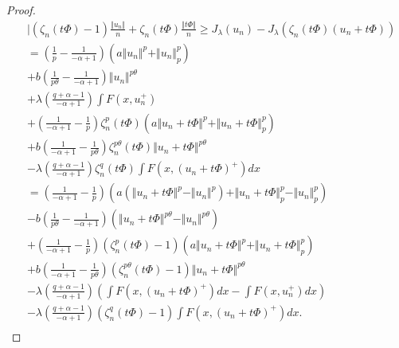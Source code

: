 \documentclass[10pt,twoside,reqno,centertags,draft]{amsart}
\begin{document}
\begin{proof}
\begin{equation}
\begin{aligned}
& \vert (\zeta_n(t\Phi) -1)\frac{\Vert u_n\Vert}{n} +\zeta_n(t\Phi)\frac{\Vert t\Phi\Vert}{n} 
\geq J_{\lambda}(u_n) -J_{\lambda}(\zeta_n(t\Phi)(u_n +t\Phi))\\
& = \left( \frac{1}{p} -\frac{1}{-\alpha +1}\right)\left( a \Vert u_n \Vert^p + \Vert u_n \Vert_{p}^{p}\right)\\
& +b\left( \frac{1}{p\theta} -\frac{1}{-\alpha +1}\right)\Vert u_n \Vert^{p \theta}\\
& +\lambda\left( \frac{q +\alpha -1}{-\alpha +1}\right) \int F(x,u_n^+)\\
& +\left(\frac{1}{-\alpha +1} - \frac{1}{p}\right)\zeta_n^{p}(t\Phi) \left( a \Vert u_n +t\Phi \Vert^p + \Vert u_n +t\Phi \Vert_{p}^{p}\right)\\
& +b\left( \frac{1}{-\alpha +1} -\frac{1}{p\theta}\right)\zeta_n^{p\theta}(t\Phi) \Vert u_n +t\Phi \Vert^{p \theta}\\
& -\lambda \left(  \frac{q +\alpha -1}{-\alpha +1}\right)\zeta^{q}_n(t\Phi) \int F(x,(u_n +t\Phi)^+)dx\\
& =\left(\frac{1}{-\alpha +1} - \frac{1}{p}\right)\left(a (\Vert u_n +t\Phi \Vert^p - \Vert u_n \Vert^p) +\Vert u_n +t\Phi \Vert_{p}^{p} -\Vert u_n \Vert_{p}^{p}\right)\\
& -b\left( \frac{1}{p\theta} -\frac{1}{-\alpha +1}\right)\left(  \Vert u_n +t\Phi \Vert^{p \theta} -\Vert u_n \Vert^{p \theta}\right)\\
& +\left(\frac{1}{-\alpha +1} - \frac{1}{p}\right)(\zeta_n^{p}(t\Phi) -1)\left( a \Vert u_n +t\Phi \Vert^p + \Vert u_n +t\Phi \Vert_{p}^{p}\right)\\
& +b\left( \frac{1}{-\alpha +1} -\frac{1}{p\theta}\right)(\zeta_n^{p\theta}(t\Phi) -1)\Vert u_n +t\Phi \Vert^{p \theta}\\
& -\lambda\left(  \frac{q +\alpha -1}{-\alpha +1}\right)\left( \int F(x,(u_n +t\Phi)^+)dx -\int F(x,u_n^+)dx\right)\\
& -\lambda\left(  \frac{q +\alpha -1}{-\alpha +1}\right)(\zeta^{q}_n(t\Phi) -1)\int F(x,(u_n +t\Phi)^+)dx. \\
\end{aligned}
\end{equation}


\end{proof}
\end{document}
